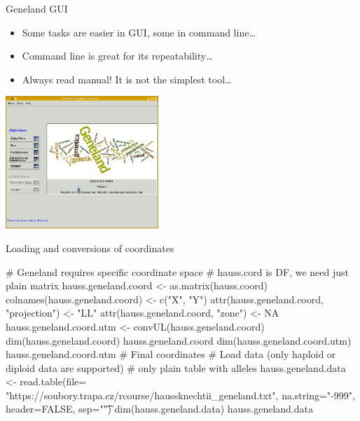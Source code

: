 \documentclass[compress, ucs, xelatex, 11pt, xcolor=svgnames,
	hyperref={
		bookmarks=true,
		unicode=true,
		colorlinks=true,
		pdftitle={Molecular data in R},
		plainpages=false,
		pdfauthor={Vojtech Zeisek},
		pdfsubject={Course about phylogeny and evolution in R},
		pdfcreator={XeLaTeX},
		pdfkeywords={R, evolution, phylogeny, molecular data},
		linkcolor=Tomato,
		anchorcolor=SaddleBrown,
		citecolor=Goldenrod,
		filecolor=DarkMagenta,
		menucolor=Sienna,
		urlcolor=DarkTurquoise,
		pdftex},
	url={hyphens, lowtilde} %
	]{beamer}
\begin{document}
\begin{frame}{Geneland GUI}
	\begin{itemize}
		\item Some tasks are easier in GUI, some in command line\ldots
		\item Command line is great for its repeatability\ldots
		\item Always read manual! It is not the simplest tool\ldots
	\end{itemize}
	\begin{center}
		\includegraphics[height=5cm]{geneland_gui.png}
	\end{center}
\end{frame}

\begin{frame}[fragile]{Loading and conversions of coordinates}
	\begin{spluscode}
    # Geneland requires specific coordinate space
    # hauss.cord is DF, we need just plain matrix
    hauss.geneland.coord <- as.matrix(hauss.coord)
    colnames(hauss.geneland.coord) <- c("X", "Y")
    attr(hauss.geneland.coord, "projection") <- "LL"
    attr(hauss.geneland.coord, "zone") <- NA
    hauss.geneland.coord.utm <- convUL(hauss.geneland.coord)
    dim(hauss.geneland.coord)
    hauss.geneland.coord
    dim(hauss.geneland.coord.utm)
    hauss.geneland.coord.utm # Final coordinates
    # Load data (only haploid or diploid data are supported)
    # only plain table with alleles
    hauss.geneland.data <- read.table(file=
      "https://soubory.trapa.cz/rcourse/haussknechtii_geneland.txt",
      na.string="-999", header=FALSE, sep="\t")
    dim(hauss.geneland.data)
    hauss.geneland.data
	\end{spluscode}
\end{frame}
\end{document}
